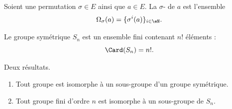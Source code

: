 \begin{definition}      \label{DEFooMVFKooMpXMQy}
	Soient une permutation \( \sigma\in E\) ainsi que \( a\in E\). La \( \sigma\)- de \( a\) est l'ensemble
	\begin{equation}
		\Omega_{\sigma}(a)=\{ \sigma^i(a) \}_{i\in \eN}.
	\end{equation}
\end{definition}

\begin{lemma}        \label{LEMooSGWKooKFIDyT}
	Le groupe symétrique \( S_n\) est un ensemble fini contenant \( n!\) éléments :
	\begin{equation}
		\Card(S_n)=n!.
	\end{equation}
\end{lemma}

\begin{lemma}        \label{LEMooUPBOooWbwMTx}
	Deux résultats.
	\begin{enumerate}
		\item
		      Tout groupe est isomorphe à un sous-groupe d'un groupe symétrique.
		\item
		      Tout groupe fini d'ordre \( n\) est isomorphe à un sous-groupe de \( S_n\).
	\end{enumerate}
\end{lemma}

